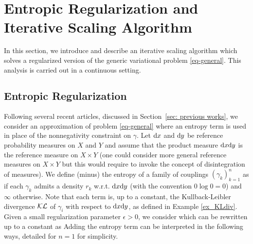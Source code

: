 

\section{Entropic Regularization and Iterative Scaling Algorithm}
\label{sec_algorithm_analysis}
%
In this section, we introduce and describe an iterative scaling algorithm which solves a regularized version of the generic variational problem \eqref{eq-general}. This analysis is carried out in a continuous setting.
%
\subsection{Entropic Regularization}
\label{subsec:EntropicRegularization}

Following several recent articles, discussed in Section~\ref{sec: previous works}, we consider an approximation of problem \eqref{eq-general} where an entropy term is used in place of the nonnegativity constraint on $\gamma$.
%
Let $\mathrm{d} x$ and $\mathrm{d} y$ be reference probability measures on $X$ and $Y$ and assume that the product measure $\mathrm{d} x \mathrm{d} y$ is the reference measure on $X\times Y$ (one could consider more general reference measures on $X\times Y$ but this would require to invoke the concept of disintegration of measures).
%
We define (minus) the entropy of a family of couplings $(\gamma_k)_{k=1}^n$ as 
if each $\gamma_k$ admits a density $r_k$ w.r.t. $\mathrm{d} x \mathrm{d} y$ (with the convention $0\log 0 = 0$) and $\infty$ otherwise.
%
Note that each term is, up to a constant, the Kullback-Leibler divergence $\operatorname{\mathcal{KL}}$ of $\gamma_i$ with respect to $\mathrm{d} x \mathrm{d} y$, as defined in Example \ref{ex_KLdiv}.
%
Given a small regularization parameter $\epsilon>0$, we consider 
which can be rewritten up to a constant as
%
Adding the entropy term can be interpreted in the following ways, detailed for $n=1$ for simplicity.

